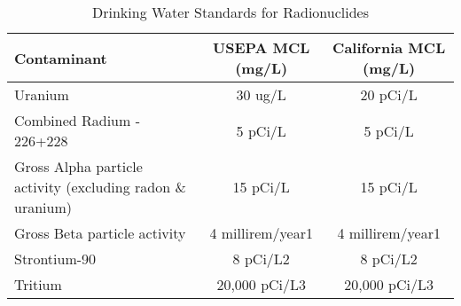 \begin{table}[ht]
\begin{center}
\begin{tabular}{|l|c|c|}
\hline
Contaminant  & USEPA   MCL  (mg/L) & California   MCL  (mg/L) \\
\hline
Uranium                                                                & 30 ug/L                                                          & 20 pCi/L   \\ \hline
Combined   Radium   -   226+228                                        & 5   pCi/L                                                         & 5   pCi/L                         \\ \hline
Gross   Alpha   particle   activity   (excluding   radon   \& uranium) & 15 pCi/L                                                          & 15 pCi/L                                                       \\ \hline
Gross   Beta   particle   activity                                     & 4 millirem/year1  & 4 millirem/year1                        \\ \hline
Strontium-90                                                           & 8   pCi/L2                                                                                                                                    & 8   pCi/L2                                                       \\ \hline
Tritium                                                                & 20,000   pCi/L3                                                  & 20,000   pCi/L3                                                  \\ \hline
\end{tabular}
\caption{Drinking Water Standards for Radionuclides}
\end{center}
\end{table}

















































